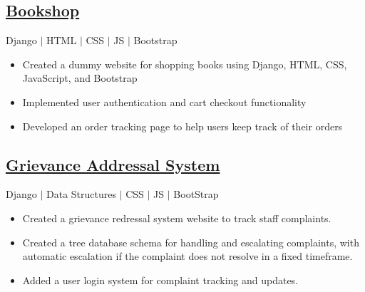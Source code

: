 \documentclass[12pt]{article}
\begin{document}
\subsection*{\href{https://github.com/prabhavagrawal7/bookshop}{Bookshop}} \quad Django $|$ HTML $|$ CSS $|$ JS $|$ Bootstrap \\
\begin{itemize}[topsep=0pt,itemsep=1pt,partopsep=3.5pt, parsep=1pt]
	\item Created a dummy website for shopping books using Django, HTML, CSS, JavaScript, and Bootstrap
	\item Implemented user authentication and cart checkout functionality
	\item Developed an order tracking page to help users keep track of their orders
\end{itemize}

\subsection*{\href{https://github.com/prabhavagrawal7/grievance-addressal-system}{Grievance Addressal System}} \quad Django $|$ Data Structures $|$ CSS $|$ JS $|$ BootStrap \\
\begin{itemize}[topsep=0pt,itemsep=1pt,partopsep=3.5pt, parsep=1pt]
	\item Created a grievance redressal system website to track staff complaints.
	\item Created a tree database schema for handling and escalating complaints, with automatic escalation if the complaint does not resolve in a fixed timeframe.
	\item Added a user login system for complaint tracking and updates.
\end{itemize}
\end{document}
